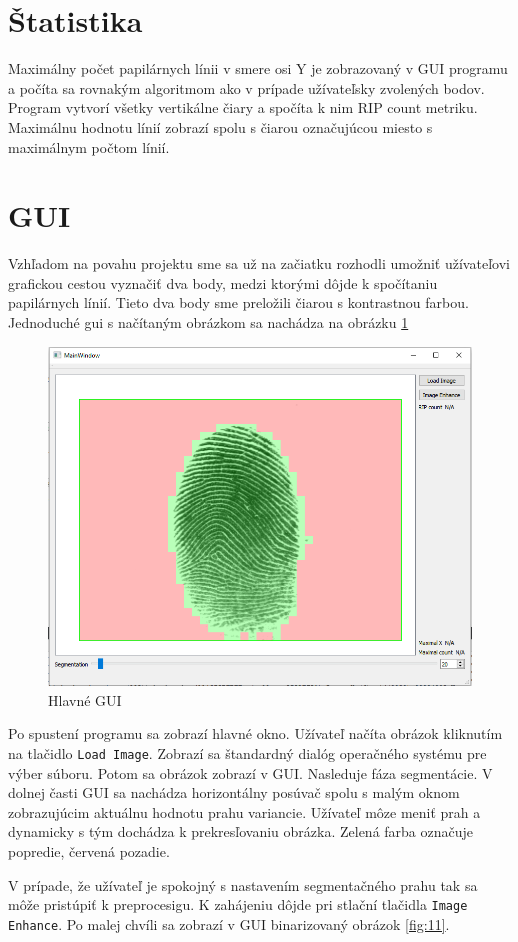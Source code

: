 \documentclass[11pt,a4paper]{article}
\begin{document}
\section*{Štatistika}
Maximálny počet papilárnych línii v smere osi Y je zobrazovaný v GUI programu a počíta sa rovnakým algoritmom ako v prípade užívateľsky zvolených bodov. Program vytvorí všetky vertikálne čiary a spočíta k nim RIP count metriku. Maximálnu hodnotu línií zobrazí spolu s čiarou označujúcou miesto s maximálnym počtom línií.


\section*{GUI}
Vzhľadom na povahu projektu sme sa už na začiatku rozhodli umožniť užívateľovi grafickou cestou vyznačiť dva body, medzi ktorými dôjde k spočítaniu papilárnych línií. Tieto dva body sme preložili čiarou s kontrastnou farbou. 
Jednoduché gui s načítaným obrázkom sa nachádza na obrázku \ref{fig:10}
\begin{figure}[h!]
	\centering
	\includegraphics[width=.7\linewidth]{images/Screenshot_14}
	\caption{Hlavné GUI}
	\label{fig:10}
\end{figure}

Po spustení programu sa zobrazí hlavné okno. Užívateľ načíta obrázok kliknutím na tlačidlo \texttt{Load Image}. Zobrazí sa štandardný dialóg operačného systému pre výber súboru. Potom sa obrázok zobrazí v GUI. Nasleduje fáza segmentácie. V dolnej časti GUI sa nachádza horizontálny posúvač spolu s malým oknom zobrazujúcim aktuálnu hodnotu prahu variancie. Užívateľ môze meniť prah a dynamicky s tým dochádza k prekresľovaniu obrázka. Zelená farba označuje popredie, červená pozadie.

V prípade, že užívateľ je spokojný s nastavením segmentačného prahu tak sa môže pristúpiť k preprocesigu. K zahájeniu dôjde pri  stlační tlačidla \texttt{Image Enhance}. Po malej chvíli sa zobrazí v GUI binarizovaný obrázok \ref{fig:11}. 
\end{document}
